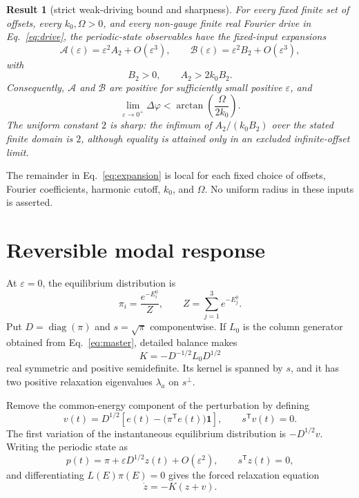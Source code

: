 \documentclass[11pt,a4paper]{article}
\newcommand{\Aobs}{\mathcal{A}}
\newcommand{\Bobs}{\mathcal{B}}
\newcommand{\eps}{\varepsilon}
\newtheorem{result}{Result}
\begin{document}
\begin{result}[strict weak-driving bound and sharpness]
\label{res:main}
For every fixed finite set of offsets, every $k_0,\Omega>0$, and every non-gauge finite
real Fourier drive in Eq.~\eqref{eq:drive}, the periodic-state observables have the
fixed-input expansions
\begin{equation}
 \Aobs(\eps)=\eps^2 A_2+O(\eps^3),\qquad
 \Bobs(\eps)=\eps^2 B_2+O(\eps^3),
 \label{eq:expansion}
\end{equation}
with
\begin{equation}
 B_2>0,\qquad A_2>2k_0B_2.
 \label{eq:mainbound}
\end{equation}
Consequently, $\Aobs$ and $\Bobs$ are positive for sufficiently small positive $\eps$,
and
\begin{equation}
 \lim_{\eps\to0^+}\Delta\varphi
 <\arctan\!\left(\frac{\Omega}{2k_0}\right).
 \label{eq:phasebound}
\end{equation}
The uniform constant $2$ is sharp: the infimum of $A_2/(k_0B_2)$ over the stated finite
domain is $2$, although equality is attained only in an excluded infinite-offset limit.
\end{result}

The remainder in Eq.~\eqref{eq:expansion} is local for each fixed choice of offsets,
Fourier coefficients, harmonic cutoff, $k_0$, and $\Omega$. No uniform radius in these
inputs is asserted.

\section{Reversible modal response}
\label{sec:response}

At $\eps=0$, the equilibrium distribution is
\begin{equation}
 \pi_i=\frac{e^{-E_i^0}}{Z},\qquad Z=\sum_{j=1}^3e^{-E_j^0}.
\end{equation}
Put $D=\operatorname{diag}(\pi)$ and $s=\sqrt{\pi}$ componentwise. If $L_0$ is the
column generator obtained from Eq.~\eqref{eq:master}, detailed balance makes
\begin{equation}
 K=-D^{-1/2}L_0D^{1/2}
 \label{eq:Kdef}
\end{equation}
real symmetric and positive semidefinite. Its kernel is spanned by $s$, and it has two
positive relaxation eigenvalues $\lambda_a$ on $s^\perp$.

Remove the common-energy component of the perturbation by defining
\begin{equation}
 v(t)=D^{1/2}\left[e(t)-\bigl(\pi^{\mathsf T}e(t)\bigr)\bm 1\right],
 \qquad s^{\mathsf T}v(t)=0.
 \label{eq:vdef}
\end{equation}
The first variation of the instantaneous equilibrium distribution is
$-D^{1/2}v$. Writing the periodic state as
\begin{equation}
 p(t)=\pi+\eps D^{1/2}z(t)+O(\eps^2),\qquad s^{\mathsf T}z(t)=0,
\end{equation}
and differentiating $L(E)\pi(E)=0$ gives the forced relaxation equation
\begin{equation}
 \dot z=-K(z+v).
 \label{eq:linearized}
\end{equation}
\end{document}

